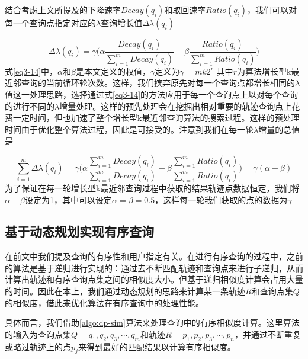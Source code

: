 结合考虑上文所提及的下降速率$Decay(q_i)$和取回速率$Ratio(q_i)$，我们可以对每一个查询点指定对应的$\lambda$查询增长值$\Delta\lambda(q_i)$

\begin{equation}
\label{eq3-14}
\Delta\lambda(q_i) = \gamma\big( \alpha\frac{Decay(q_i)}{\sum_{i=1}^{m}Decay(q_i)} + \beta\frac{Ratio(q_i)}{\sum_{i=1}^{m}Ratio(q_i)} \big)
\end{equation}
式\ref{eq3-14}中，$\alpha$和$\beta$是本文定义的权值，$\gamma$定义为$\gamma = mk2^{r}$ 其中$r$为算法增长型k最近邻查询的当前循环轮次数。这样，我们摈弃原先对每一个查询点都增长相同的$\lambda$值这一处理思路，选择通过式\ref{eq3-14}的方法应用于每一个查询点上以对每个查询的进行不同的$\lambda$增量处理。这样的预先处理会在挖掘出相对重要的轨迹查询点上花费一定时间，但也加速了整个增长型k最近邻查询算法的搜索过程。这样的预处理时间由于优化整个算法过程，因此是可接受的。注意到我们在每一轮$\lambda$增量的总值是

\begin{displaymath}
\sum_{i=1}^{m}\Delta\lambda(q_i)=\gamma\big( \alpha\frac{\sum_{i=1}^{m}Decay(q_i)}{\sum_{i=1}^{m}Decay(q_i)} + \beta\frac{\sum_{i=1}^{m}Ratio(q_i)}{\sum_{i=1}^{m}Ratio(q_i)} \big)=\gamma(\alpha+\beta)
\end{displaymath}
为了保证在每一轮增长型k最近邻查询过程中获取的结果轨迹点数据恒定，我们将$\alpha+\beta$设定为1，其中可以设定$\alpha=\beta=0.5$，这样每一轮我们获取的点的数据为$\gamma$
\\

\subsection{基于动态规划实现有序查询}
\label{subsec:orderquery}
在前文中我们提及查询的有序性和用户指定有关。在进行有序查询的过程中，之前的算法是基于递归进行实现的：通过去不断匹配轨迹和查询点来进行子递归，从而计算出轨迹和有序查询点集之间的相似度大小。但基于递归相似度计算会占用大量的时间。因此在本上，我们通过动态规划的思路来计算某一条轨迹$R$和查询点集$Q$的相似度，借此来优化算法在有序查询中的处理性能。

具体而言，我们借助\ref{algo:dp-sim}算法来处理查询中的有序相似度计算。这里算法的输入为查询点集$Q={q_1,q_2,q_3,\cdots,q_m}$和轨迹$R={p_1,p_2,p_3,\cdots,p_n}$，并通过不断重复或略过轨迹上的点$p_j$来得到最好的匹配结果以计算有序相似度。

